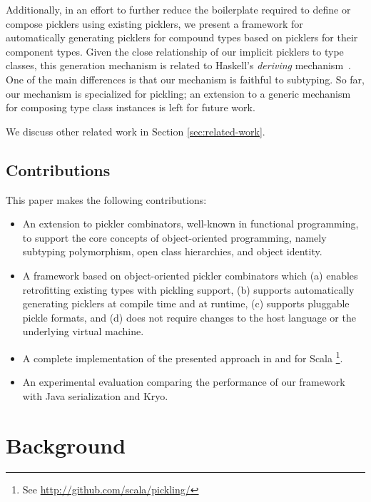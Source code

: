 \documentclass[preprint,10pt]{sigplanconf}
\theoremstyle{definition}
\theoremstyle{definition}
\begin{document}
Additionally, in an effort to further reduce the boilerplate required
to define or compose picklers using existing picklers, we present a
framework for automatically generating picklers for compound types
based on picklers for their component types. Given the close
relationship of our implicit picklers to type classes, this generation
mechanism is related to Haskell's {\em deriving}
mechanism~\cite{MagalhaesDJL10}. One of the main differences is that
our mechanism is faithful to subtyping. So far, our mechanism is
specialized for pickling; an extension to a generic mechanism for
composing type class instances is left for future work.

We discuss other related work in Section \ref{sec:related-work}.

\subsection{Contributions}

This paper makes the following contributions:

\begin{itemize}

\item An extension to pickler combinators, well-known in functional
programming, to support the core concepts of object-oriented programming,
namely subtyping polymorphism, open class hierarchies, and object identity.

\item A framework based on object-oriented pickler combinators which (a)
enables retrofitting existing types with pickling support, (b) supports
automatically generating picklers at compile time and at runtime, (c) supports
pluggable pickle formats, and (d) does not require changes to the host
language or the underlying virtual machine.

\item A complete implementation of the presented approach in and for Scala
\footnote{See \url{http://github.com/scala/pickling/}}.

\item An experimental evaluation comparing the performance of our framework
with Java serialization and Kryo.

\end{itemize}

\section{Background}
\label{sec:background}
\end{document}
